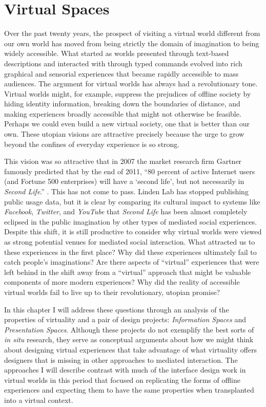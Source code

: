 \chapter{Virtual Spaces}
\label{ch:virtual}

Over the past twenty years, the prospect of visiting a virtual world different from our own world has moved from being strictly the domain of imagination to being widely accessible. What started as worlds presented through text-based descriptions and interacted with through typed commands evolved into rich graphical and sensorial experiences that became rapidly accessible to mass audiences. The argument for virtual worlds has always had a revolutionary tone. Virtual worlds might, for example, suppress the prejudices of offline society by hiding identity information, breaking down the boundaries of distance, and making experiences broadly accessible that might not otherwise be feasible. Perhaps we could even build a new virtual society, one that is better than our own. These utopian visions are attractive precisely because the urge to grow beyond the confines of everyday experience is so strong.

This vision was so attractive that in 2007 the market research firm Gartner famously predicted that by the end of 2011, ``80 percent of active Internet users (and Fortune 500 enterprises) will have a `second life', but not necessarily in \emph{Second Life}.'' \citep{Anonymous:2007wz}. This has not come to pass. Linden Lab has stopped publishing public usage data, but it is clear by comparing its cultural impact to systems like \emph{Facebook}, \emph{Twitter}, and \emph{YouTube} that \emph{Second Life} has been almost completely eclipsed in the public imagination by other types of mediated social experiences. Despite this shift, it is still productive to consider why virtual worlds were viewed as strong potential venues for mediated social interaction. What attracted us to these experiences in the first place? Why did these experiences ultimately fail to catch people's imaginations? Are there aspects of ``virtual'' experiences that were left behind in the shift away from a ``virtual'' approach that might be valuable components of more modern experiences? Why did the reality of accessible virtual worlds fail to live up to their revolutionary, utopian promise?

In this chapter I will address these questions through an analysis of the properties of virtuality and a pair of design projects: \emph{Information Spaces} and \emph{Presentation Spaces}. Although these projects do not exemplify the best sorts of \emph{in situ} research, they serve as conceptual arguments about how we might think about designing virtual experiences that take advantage of what virtuality offers designers that is missing in other approaches to mediated interaction. The approaches I will describe contrast with much of the interface design work in virtual worlds in this period that focused on replicating the forms of offline experiences and expecting them to have the same properties when transplanted into a virtual context.

